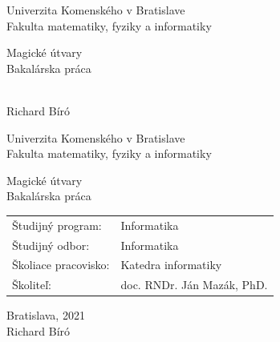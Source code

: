 \documentclass[12pt, twoside]{book}
\def\mfrok{2021}
\def\mfnazov{Magické útvary}
\def\mftyp{Bakalárska práca}
\def\mfautor{Richard Bíró}
\def\mfskolitel{doc. RNDr. Ján Mazák, PhD.}
\def\mfkonzultant{tit. Meno Priezvisko, tit. }
\def\mfmiesto{Bratislava, \mfrok}
\def\mfodbor{ Informatika}
\def\program{ Informatika }
\def\mfpracovisko{ Katedra informatiky }
\begin{document}
     
\frontmatter


\thispagestyle{empty}

\begin{center}
\sc\large
Univerzita Komenského v Bratislave\\
Fakulta matematiky, fyziky a informatiky

\vfill

{\LARGE\mfnazov}\\
\mftyp
\end{center}

\vfill

{\sc\large 
\noindent \mfrok\\
\mfautor
}

\cleardoublepage


\thispagestyle{empty}
\noindent

\begin{center}
\sc  
\large
Univerzita Komenského v Bratislave\\
Fakulta matematiky, fyziky a informatiky

\vfill

{\LARGE\mfnazov}\\
\mftyp
\end{center}

\vfill

\noindent
\begin{tabular}{ll}
Študijný program: & \program \\
Študijný odbor: & \mfodbor \\
Školiace pracovisko: & \mfpracovisko \\
Školiteľ: & \mfskolitel \\
\end{tabular}

\vfill


\noindent \mfmiesto\\
\mfautor

\cleardoublepage


\end{document}
